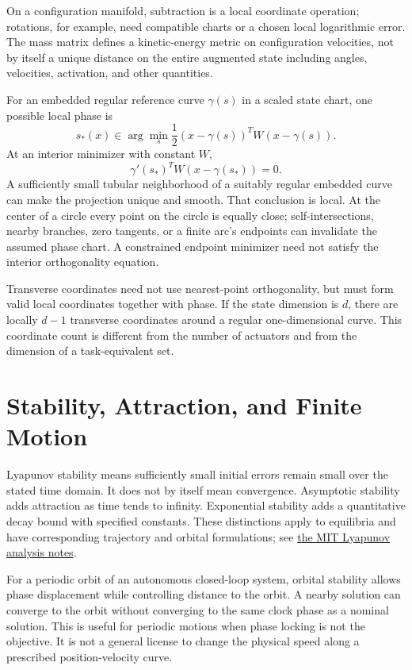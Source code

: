 \documentclass[12pt, openany]{book}
\theoremstyle{plain}
\begin{document}
On a configuration manifold, subtraction is a local coordinate operation;
rotations, for example, need compatible charts or a chosen local logarithmic
error. The mass matrix defines a kinetic-energy metric on configuration
velocities, not by itself a unique distance on the entire augmented state
including angles, velocities, activation, and other quantities.

For an embedded regular reference curve $\gamma(s)$ in a scaled state chart,
one possible local phase is
\begin{equation}
 s_*(x)\in\arg\min_s\frac12(x-\gamma(s))^TW(x-\gamma(s)).
 \label{eq:motion_projection_phase}
\end{equation}
At an interior minimizer with constant $W$,
\begin{equation}
 \gamma'(s_*)^TW(x-\gamma(s_*))=0.
 \label{eq:motion_phase_orthogonality}
\end{equation}
A sufficiently small tubular neighborhood of a suitably regular embedded curve
can make the projection unique and smooth. That conclusion is local. At the
center of a circle every point on the circle is equally close; self-intersections,
nearby branches, zero tangents, or a finite arc's endpoints can invalidate the
assumed phase chart. A constrained endpoint minimizer need not satisfy the
interior orthogonality equation.

Transverse coordinates need not use nearest-point orthogonality, but must form
valid local coordinates together with phase. If the state dimension is $d$,
there are locally $d-1$ transverse coordinates around a regular one-dimensional
curve. This coordinate count is different from the number of actuators and
from the dimension of a task-equivalent set.

\section{Stability, Attraction, and Finite Motion}

Lyapunov stability means sufficiently small initial errors remain small over
the stated time domain. It does not by itself mean convergence. Asymptotic
stability adds attraction as time tends to infinity. Exponential stability adds
a quantitative decay bound with specified constants. These distinctions apply
to equilibria and have corresponding trajectory and orbital formulations; see
\href{https://underactuated.mit.edu/lyapunov.html}{the MIT Lyapunov analysis notes}.

For a periodic orbit of an autonomous closed-loop system, orbital stability
allows phase displacement while controlling distance to the orbit. A nearby
solution can converge to the orbit without converging to the same clock phase
as a nominal solution. This is useful for periodic motions when phase locking
is not the objective. It is not a general license to change the physical speed
along a prescribed position-velocity curve.
\end{document}
